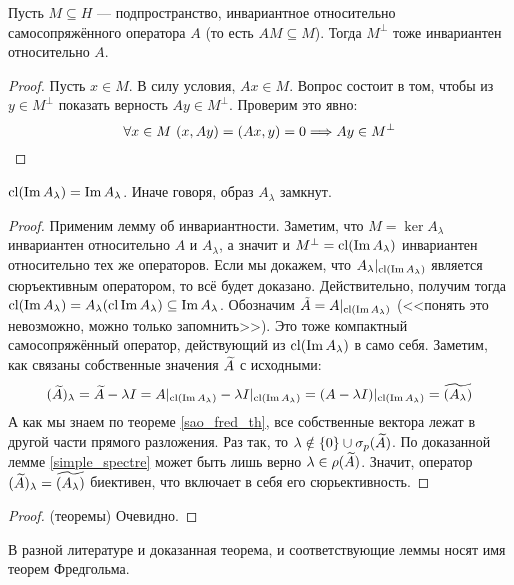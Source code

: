 \begin{lemma}
	Пусть $M \subseteq H$ --- подпространство, инвариантное относительно самосопряжённого оператора $A$ (то есть $AM \subseteq M$). Тогда $M^\bot$ тоже инвариантен относительно $A$.
\end{lemma}

\begin{proof}
	Пусть $x \in M$. В силу условия, $Ax \in M$. Вопрос состоит в том, чтобы из  $y \in M^\bot$ показать верность $Ay \in M^\bot$. Проверим это явно:
	\[
		\forall x \in M\ (x, Ay) = (Ax, y) = 0 \Longrightarrow Ay \in M^\bot
	\]
\end{proof}

\begin{lemma}
	$\operatorname{cl} (\operatorname{Im} A_\lambda) = \operatorname{Im} A_\lambda$. Иначе говоря, образ $A_\lambda$ замкнут.
\end{lemma}

\begin{proof}
	Применим лемму об инвариантности. Заметим, что $M = \ker A_\lambda$ инвариантен относительно $A$ и $A_\lambda$, а значит и $M^\bot = \operatorname{cl}(\operatorname{Im} A_\lambda)$ инвариантен относительно тех же операторов. Если мы докажем, что $A_\lambda|_{\operatorname{cl}(\operatorname{Im} A_\lambda)}$ является сюръективным оператором, то всё будет доказано. Действительно, получим тогда $\operatorname{cl}(\operatorname{Im} A_\lambda) = A_\lambda(\operatorname{cl} \operatorname{Im} A_\lambda) \subseteq \operatorname{Im} A_\lambda$. Обозначим $\tilde{A} = A|_{\operatorname{cl}(\operatorname{Im} A_\lambda)}$ (<<понять это невозможно, можно только запомнить>>). Это тоже компактный самосопряжённый оператор, действующий из $\operatorname{cl}(\operatorname{Im} A_\lambda)$ в само себя. Заметим, как связаны собственные значения $\widetilde{A}$ с исходными:
	\[
		(\widetilde{A})_\lambda = \widetilde{A} - \lambda I = A|_{\operatorname{cl}(\operatorname{Im} A_\lambda)} - \lambda I|_{\operatorname{cl}(\operatorname{Im} A_\lambda)} = (A - \lambda I)|_{\operatorname{cl}(\operatorname{Im} A_\lambda)} = \widetilde{(A_\lambda)}
	\]
	А как мы знаем по теореме \ref{sao_fred_th}, все собственные вектора лежат в другой части прямого разложения. Раз так, то $\lambda \notin \{0\} \cup \sigma_p(\widetilde{A})$. По доказанной лемме \ref{simple_spectre} может быть лишь верно $\lambda \in \rho(\widetilde{A})$. Значит, оператор $(\widetilde{A})_\lambda = \widetilde{(A_\lambda)}$ биективен, что включает в себя его сюрьективность.
\end{proof}

\begin{proof} (теоремы)
	Очевидно.
\end{proof}

\begin{note}
	В разной литературе и доказанная теорема, и соответствующие леммы носят имя теорем Фредгольма.
\end{note}

